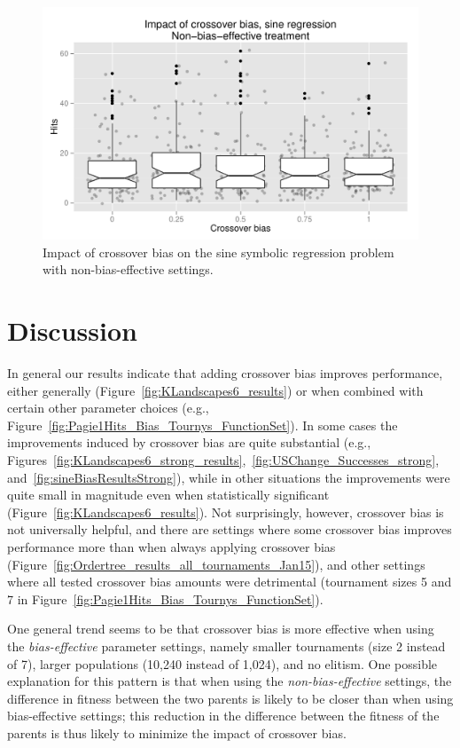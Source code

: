 \documentclass{sig-alternate}
\begin{document}
\begin{figure}[t]
\centering
\includegraphics[width=0.45 \textwidth]{Plots/Sine_XO_impact_weak_e01_boxplot.pdf}
\caption{Impact of crossover bias on the sine symbolic regression problem with non-bias-effective settings.}
\label{fig:sineBiasResultsWeak}
\end{figure}

\pagebreak

\section{Discussion} \label{sec:Discussion}

In general our results indicate that adding crossover bias improves performance, either generally
(Figure~\ref{fig:KLandscapes6_results}) or when combined with certain other parameter choices (e.g.,
Figure~\ref{fig:Pagie1Hits_Bias_Tournys_FunctionSet}). In some cases the improvements induced by crossover bias are
quite substantial (e.g., Figures~\ref{fig:KLandscapes6_strong_results},~\ref{fig:USChange_Successes_strong},
and~\ref{fig:sineBiasResultsStrong}), while in other situations the improvements were quite small in magnitude even
when statistically significant (Figure~\ref{fig:KLandscapes6_results}). Not surprisingly, however, crossover bias is
not universally helpful, and there are settings where some crossover bias improves performance more than when always
applying crossover bias (Figure~\ref{fig:Ordertree_results_all_tournaments_Jan15}), and other settings where all tested
crossover bias amounts were detrimental (tournament sizes 5 and 7 in
Figure~\ref{fig:Pagie1Hits_Bias_Tournys_FunctionSet}).

One general trend seems to be that crossover bias is more effective when using the \emph{bias-effective} parameter
settings, namely smaller tournaments (size 2 instead of 7), larger populations (10,240 instead of 1,024), and no
elitism. One possible explanation for this pattern is that when using the \emph{non-bias-effective} settings, 
the difference in fitness between the two parents is likely to be
closer than when using bias-effective settings; this reduction in the difference between the fitness of the 
parents is thus likely to minimize the impact of crossover bias.
\end{document}
